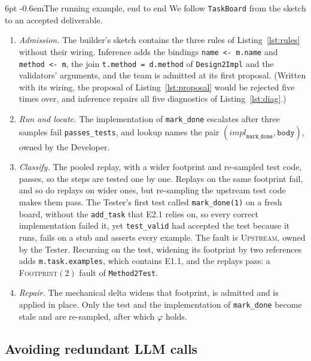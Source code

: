 \documentclass[pdflatex,sn-mathphys-num]{sn-jnl}
\makeatletter
\theoremstyle{thmstyleone}%
\theoremstyle{thmstyletwo}%
\theoremstyle{thmstylethree}%
\newcommand{\code}[1]{\texttt{#1}}
\renewcommand\paragraph{\@startsection{paragraph}{4}{\z@}%
  {6pt \@plus 2pt \@minus 1pt}{-0.6em}{\normalfont\normalsize\bfseries}}
\makeatother
\begin{document}
\paragraph{The running example, end to end} We follow \code{TaskBoard} from
the sketch to an accepted deliverable.
\begin{enumerate}[label=\arabic*., leftmargin=1.6em, itemsep=2pt, topsep=2pt]
\item \emph{Admission.} The builder's sketch contains the three rules of
Listing~\ref{lst:rules} without their wiring. Inference adds the bindings
\code{name <- m.name} and \code{method <- m}, the join
\code{t.method = d.method} of \code{Design2Impl} and the validators' arguments,
and the team is admitted at its first proposal. (Written with its wiring, the
proposal of Listing~\ref{lst:proposal} would be rejected five times over, and
inference repairs all five diagnostics of Listing~\ref{lst:diag}.)
\item \emph{Run and locate.} The implementation of \code{mark\_done} escalates
after three samples fail \code{passes\_tests}, and lookup names the pair
$(\mathit{impl}_{\code{mark\_done}},\code{body})$, owned by the Developer.
\item \emph{Classify.} The pooled replay, with a wider footprint and re-sampled
test code, passes, so the steps are tested one by one. Replays on the same
footprint fail, and so do replays on wider ones, but re-sampling the upstream
test code makes them pass. The Tester's first test called
\code{mark\_done(1)} on a fresh board, without the \code{add\_task} that E2.1
relies on, so every correct implementation failed it, yet \code{test\_valid}
had accepted the test because it runs, fails on a stub and asserts every
example. The fault is \textsc{Upstream}, owned by the Tester. Recursing on the
test, widening its footprint by two references adds \code{m.task.examples},
which contains E1.1, and the replays pass: a \textsc{Footprint}$(2)$ fault of
\code{Method2Test}.
\item \emph{Repair.} The mechanical delta widens that footprint, is admitted
and is applied in place. Only the test and the implementation of
\code{mark\_done} become stale and are re-sampled, after which $\varphi$ holds.
\end{enumerate}

\subsection{Avoiding redundant LLM calls}\label{sec:app-cost}
\end{document}
